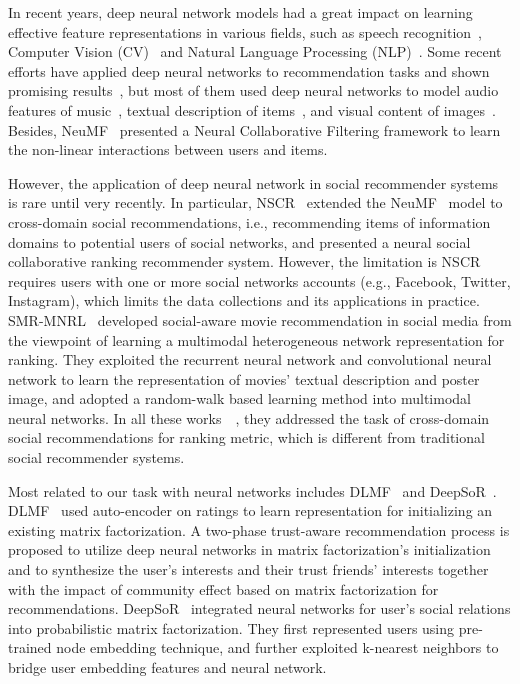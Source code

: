 \documentclass[sigconf]{acmart} \copyrightyear{2019}
\begin{document}
In recent years, deep neural network models had a great impact on learning effective feature representations in various fields, such as speech recognition~\cite{hinton2012deep}, Computer Vision (CV)~\cite{karimi2018toward} and Natural Language Processing (NLP)~\cite{chen2017survey}. Some recent efforts have applied deep neural networks to recommendation tasks and shown promising results~\cite{zhao2018recommendations}, but most of them used deep neural networks to model audio features of music~\cite{van2013deep}, textual description of items~\cite{wang2015collaborative, Chen2018Neural}, and visual content of images~\cite{ZhaoLP016}. Besides, NeuMF~\cite{He2017NCF} presented a Neural Collaborative Filtering framework to learn the non-linear interactions between users and items.


However, the application of deep neural network in social recommender systems is rare until very recently. In particular, NSCR~\cite{wang2017item} extended the NeuMF~\cite{He2017NCF} model to cross-domain social recommendations, i.e., recommending items of information domains to potential users of social networks, and presented a neural social collaborative ranking recommender system.  However, the limitation is NSCR requires users with one or more social networks accounts (e.g., Facebook, Twitter, Instagram), which limits the data collections and its applications in practice. SMR-MNRL~\cite{zhao2018social} developed social-aware movie recommendation in social media from the viewpoint of learning a multimodal heterogeneous network representation for ranking. They exploited the recurrent neural network and convolutional neural network to learn the representation of movies' textual description and poster image, and adopted a random-walk based learning method into multimodal neural networks. In all these works~\cite{wang2017item}~\cite{zhao2018social}, they addressed the task of cross-domain social recommendations for ranking metric, which is different from traditional social recommender systems.

Most related to our task with neural networks includes DLMF~\cite{deng2017deep} and DeepSoR~\cite{DeepSoR2018}. DLMF~\cite{deng2017deep} used auto-encoder on ratings to learn representation for initializing an existing matrix factorization. A two-phase trust-aware recommendation process is proposed to utilize deep neural networks in matrix factorization's initialization and to synthesize the user's interests and their trust friends' interests together with the impact of community effect based on matrix factorization for recommendations. DeepSoR~\cite{DeepSoR2018}
integrated neural networks for user's social relations into probabilistic matrix factorization. They first represented users using pre-trained node embedding technique, and further exploited k-nearest neighbors to bridge user embedding features and neural network.
\end{document}
